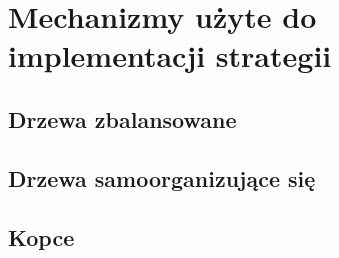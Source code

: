 \section{Mechanizmy użyte do implementacji strategii}

\subsection{Drzewa zbalansowane}

\subsection{Drzewa samoorganizujące się}

\subsection{Kopce}


